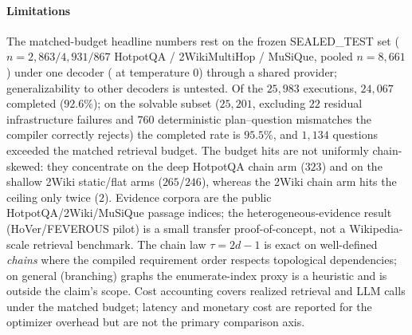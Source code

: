\paragraph{Limitations}
The matched-budget headline numbers rest on the frozen SEALED\_TEST set
($n{=}2{,}863/4{,}931/867$ HotpotQA / 2WikiMultiHop / MuSiQue, pooled
$n{=}8{,}661$) under one decoder ( at temperature $0$) through
a shared provider; generalizability to other decoders is untested. Of the
$25{,}983$ executions, $24{,}067$ completed ($92.6\%$); on the solvable subset
($25{,}201$, excluding $22$ residual infrastructure failures and $760$
deterministic plan--question mismatches the compiler correctly rejects) the
completed rate is $95.5\%$, and $1{,}134$ questions exceeded the matched
retrieval budget. The budget hits are not uniformly chain-skewed: they
concentrate on the deep HotpotQA chain arm ($323$) and on the shallow 2Wiki
static/flat arms ($265$/$246$), whereas the 2Wiki chain arm hits the ceiling
only twice ($2$).
Evidence corpora are the public HotpotQA/2Wiki/MuSiQue passage indices; the
heterogeneous-evidence result (HoVer/FEVEROUS pilot) is a small transfer
proof-of-concept, not a Wikipedia-scale retrieval benchmark. The chain law
$\tau = 2d - 1$ is exact on well-defined \emph{chains} where the compiled
requirement order respects topological dependencies; on general (branching)
graphs the enumerate-index proxy is a heuristic and is outside the claim's
scope. Cost accounting covers realized retrieval and LLM calls under the
matched budget; latency and monetary cost are reported for the optimizer
overhead but are not the primary comparison axis.
